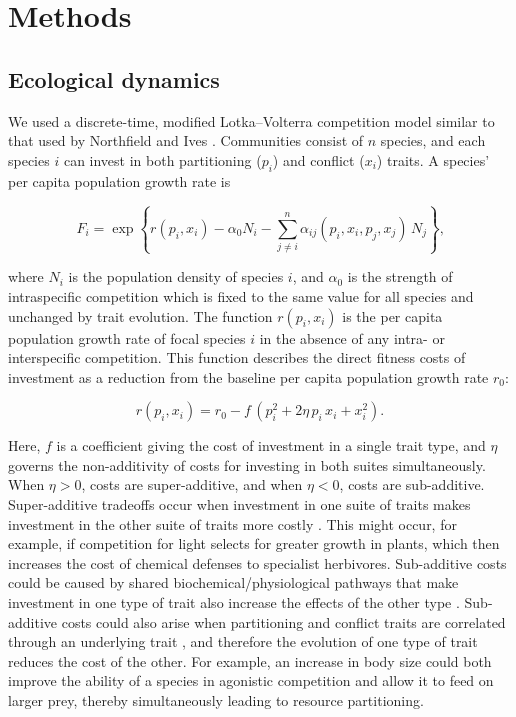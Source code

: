 
\section*{Methods}

\subsection*{Ecological dynamics}

We used a discrete-time, modified Lotka--Volterra competition model
similar to that used by Northfield and Ives
\citep{Northfield2013a}. Communities consist of $n$ species,
and each species $i$ can invest in both partitioning ($p_{i}$) and
conflict ($x_{i}$) traits. A species' per capita population growth
rate is

\begin{equation} \label{eq:pg-growth}
    F_{i} = \exp\left\{
        r(p_i, x_i)
        - \alpha_0 N_{i} 
        - \sum_{j \ne i}^{n}{
            \alpha_{ij}(p_i, x_i, p_j, x_j) \, N_j}
        \right\}
    \textrm{,}
\end{equation}

\noindent where $N_{i}$ is the population density of species $i$, and
$\alpha_{0}$ is the strength of intraspecific competition which is
fixed to the same value for all species and unchanged by trait
evolution. The function $r( p_{i},x_{i} )$ is the per
capita population growth rate of focal species $i$ in the absence of
any intra- or interspecific competition. This function describes the
direct fitness costs of investment as a reduction from the baseline per
capita population growth rate $r_{0}$:

\begin{equation} \label{eq:growth-rate}
    r(p_i, x_i) = r_0 - f \, \left( p_i^2 + 2 \eta \, p_i \, x_i + x_i^2 \right)
    \textrm{.}
\end{equation}

\noindent Here, $f$ is a coefficient giving the cost of investment in a single
trait type, and $\eta$ governs the non-additivity of costs for
investing in both suites simultaneously. When $\eta > 0$, costs are
super-additive, and when $\eta < 0$, costs are sub-additive.
Super-additive tradeoffs occur when investment in one suite of traits
makes investment in the other suite of traits more costly \citep{Garland2022}.
% 
This might occur, for example, if competition for light selects for greater
growth in plants, which then increases the cost of chemical defenses to
specialist herbivores.
% 
Sub-additive costs could be caused by shared
biochemical/physiological pathways that make investment in one type of
trait also increase the effects of the other type \citep{Garland1994,
Garland2022}. Sub-additive costs could also arise when
partitioning and conflict traits are correlated through an underlying
trait \citep{Strauss2004}, and therefore the evolution of one
type of trait reduces the cost of the other. For example, an increase in
body size could both improve the ability of a species in agonistic competition
and allow it to feed on larger prey, thereby simultaneously leading to 
resource partitioning.

